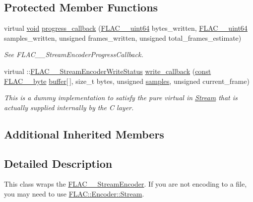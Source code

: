 \subsection*{Protected Member Functions}
\begin{DoxyCompactItemize}
\item 
virtual \hyperlink{sound_8c_ae35f5844602719cf66324f4de2a658b3}{void} \hyperlink{class_f_l_a_c_1_1_encoder_1_1_file_a296c7f44291dbf7389295d006f4d381d}{progress\+\_\+callback} (\hyperlink{ordinals_8h_aa78c8c70a3eb8a58af7436f278acde8e}{F\+L\+A\+C\+\_\+\+\_\+uint64} bytes\+\_\+written, \hyperlink{ordinals_8h_aa78c8c70a3eb8a58af7436f278acde8e}{F\+L\+A\+C\+\_\+\+\_\+uint64} samples\+\_\+written, unsigned frames\+\_\+written, unsigned total\+\_\+frames\+\_\+estimate)
\begin{DoxyCompactList}\small\item\em See F\+L\+A\+C\+\_\+\+\_\+\+Stream\+Encoder\+Progress\+Callback. \end{DoxyCompactList}\item 
virtual \+::\hyperlink{group__flac__stream__encoder_ga3737471fd49730bb8cf9b182bdeda05e}{F\+L\+A\+C\+\_\+\+\_\+\+Stream\+Encoder\+Write\+Status} \hyperlink{class_f_l_a_c_1_1_encoder_1_1_file_aef24c8e67268319c0d49bf539ab0bd02}{write\+\_\+callback} (\hyperlink{getopt1_8c_a2c212835823e3c54a8ab6d95c652660e}{const} \hyperlink{ordinals_8h_a5eb569b12d5b047cdacada4d57924ee3}{F\+L\+A\+C\+\_\+\+\_\+byte} \hyperlink{structbuffer}{buffer}\mbox{[}$\,$\mbox{]}, size\+\_\+t bytes, unsigned \hyperlink{test__w__saw8_8c_a54185623a5a093f671a73e5fba6197a1}{samples}, unsigned current\+\_\+frame)
\begin{DoxyCompactList}\small\item\em This is a dummy implementation to satisfy the pure virtual in \hyperlink{class_f_l_a_c_1_1_encoder_1_1_stream}{Stream} that is actually supplied internally by the C layer. \end{DoxyCompactList}\end{DoxyCompactItemize}
\subsection*{Additional Inherited Members}


\subsection{Detailed Description}
This class wraps the \hyperlink{struct_f_l_a_c_____stream_encoder}{F\+L\+A\+C\+\_\+\+\_\+\+Stream\+Encoder}. If you are not encoding to a file, you may need to use \hyperlink{class_f_l_a_c_1_1_encoder_1_1_stream}{F\+L\+A\+C\+::\+Encoder\+::\+Stream}. 

